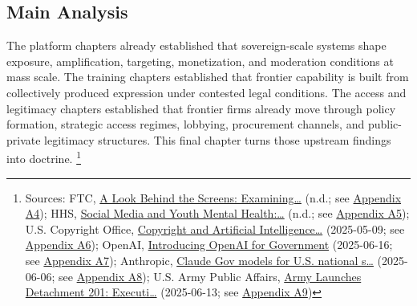 \documentclass[
  american,
  11pt,
  letterpaper,
]{article}
\begin{document}
\subsection{Main Analysis}\label{main-analysis}

The platform chapters already established that sovereign-scale systems
shape exposure, amplification, targeting, monetization, and moderation
conditions at mass scale. The training chapters established that
frontier capability is built from collectively produced expression under
contested legal conditions. The access and legitimacy chapters
established that frontier firms already move through policy formation,
strategic access regimes, lobbying, procurement channels, and
public-private legitimacy structures. This final chapter turns those
upstream findings into doctrine. \footnote{Sources: FTC,
  \href{https://www.ftc.gov/reports/look-behind-screens-examining-data-practices-social-media-video-streaming-services}{A
  Look Behind the Screens: Examining\ldots{}} (n.d.; see
  \hyperref[appendix-a4-a-look-behind-the-screens-examining-the-data-practices-of-social-media-and-video-streaming-services]{Appendix
  A4}); HHS,
  \href{https://www.hhs.gov/surgeongeneral/priorities/youth-mental-health/social-media/index.html}{Social
  Media and Youth Mental Health:\ldots{}} (n.d.; see
  \hyperref[appendix-a5-social-media-and-youth-mental-health-the-u-s-surgeon-general-s-advisory]{Appendix
  A5}); U.S. Copyright Office,
  \href{https://copyright.gov/ai/Copyright-and-Artificial-Intelligence-Part-3-Generative-AI-Training-Report-Pre-Publication-Version.pdf}{Copyright
  and Artificial Intelligence\ldots{}} (2025-05-09; see
  \hyperref[appendix-a6-copyright-and-artificial-intelligence-part-3-generative-ai-training-pre-publication-version]{Appendix
  A6}); OpenAI,
  \href{https://openai.com/global-affairs/introducing-openai-for-government/}{Introducing
  OpenAI for Government} (2025-06-16; see
  \hyperref[appendix-a7-introducing-openai-for-government]{Appendix
  A7}); Anthropic,
  \href{https://www.anthropic.com/news/claude-gov-models-for-u-s-national-security-customers}{Claude
  Gov models for U.S. national s\ldots{}} (2025-06-06; see
  \hyperref[appendix-a8-claude-gov-models-for-u-s-national-security-customers]{Appendix
  A8}); U.S. Army Public Affairs,
  \href{https://www.army.mil/article/286317/army_launches_detachment_201_executive_innovation_corps_to_drive_tech_transformation}{Army
  Launches Detachment 201: Executi\ldots{}} (2025-06-13; see
  \hyperref[appendix-a9-army-launches-detachment-201-executive-innovation-corps-to-drive-tech-transformation]{Appendix
  A9})}
\end{document}
